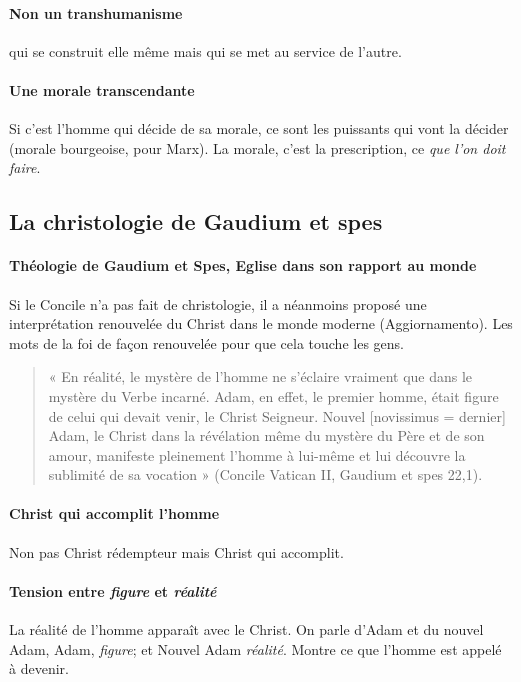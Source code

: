 \paragraph{Non un transhumanisme} qui se construit elle même mais qui se met au service de l'autre.
\paragraph{Une morale transcendante} Si c'est l'homme qui décide de sa morale, ce sont les puissants qui vont la décider (morale bourgeoise, pour Marx). La morale, c'est la prescription, ce \textit{que l'on doit faire}. 


\subsection{La christologie de Gaudium et spes} 

\paragraph{Théologie de Gaudium et Spes, Eglise dans son rapport au monde} Si le Concile n'a pas fait de christologie, il a néanmoins proposé une interprétation renouvelée du Christ dans le monde moderne (Aggiornamento). Les mots de la foi de façon renouvelée pour que cela touche les gens.

\begin{quote}
    « En réalité, le mystère de l’homme ne s’éclaire vraiment que dans le mystère du Verbe incarné. Adam, en effet, le premier homme, était figure de celui qui devait venir, le Christ Seigneur. Nouvel [novissimus = dernier] Adam, le Christ dans la révélation même du mystère du Père et de son amour, manifeste pleinement l’homme à lui-même et lui découvre la sublimité de sa vocation » (Concile Vatican II, Gaudium et spes 22,1). 
\end{quote}

\paragraph{Christ qui accomplit l'homme} Non pas Christ rédempteur mais Christ qui accomplit.

\paragraph{Tension entre \textit{figure} et \textit{réalité}} La réalité de l'homme apparaît avec le Christ. On parle d'Adam et du nouvel Adam, Adam, \textit{figure}; et Nouvel Adam \textit{réalité}. Montre ce que l'homme est appelé à devenir.

